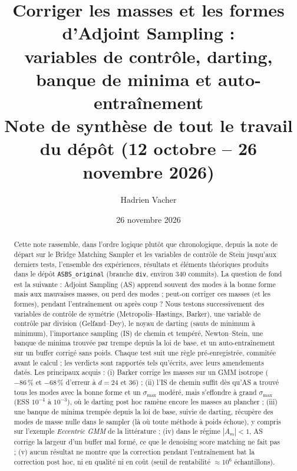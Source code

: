 \documentclass[11pt,a4paper]{article}
\title{Corriger les masses et les formes d'Adjoint Sampling :\\
variables de contrôle, darting, banque de minima et auto-entraînement\\[4pt]
\large Note de synthèse de tout le travail du dépôt (12 octobre -- 26 novembre 2026)}
\author{Hadrien Vacher}
\date{26 novembre 2026}
\newcommand{\smax}{\sigma_{\max}}
\newcommand{\Am}{A_{m}}
\DeclareRobustCommand{\code}[1]{\nolinkurl{#1}}%
\theoremstyle{remark}
\begin{document}
\maketitle

\begin{abstract}
Cette note rassemble, dans l'ordre logique plutôt que chronologique, depuis la note de départ sur le Bridge Matching Sampler et les variables de contrôle de Stein jusqu'aux derniers tests, l'ensemble des expériences, résultats et éléments théoriques produits dans le dépôt \code{ASBS_original} (branche \code{div}, environ 340 commits). La question de fond est la suivante : Adjoint Sampling (AS) apprend souvent des modes à la bonne forme mais aux mauvaises masses, ou perd des modes ; peut-on corriger ces masses (et les formes), pendant l'entraînement ou après coup ? Nous testons successivement des variables de contrôle de symétrie (Metropolis--Hastings, Barker), une variable de contrôle par division (Gelfand--Dey), le noyau de darting (sauts de minimum à minimum), l'importance sampling (IS) de chemin et tempéré, Newton--Stein, une banque de minima trouvée par trempe depuis la loi de base, et un auto-entraînement sur un buffer corrigé sans poids. Chaque test suit une règle pré-enregistrée, commitée avant le calcul ; les verdicts sont rapportés tels qu'écrits, avec leurs amendements datés. Les principaux acquis : (i) Barker corrige les masses sur un GMM isotrope ($-86\,\%$ et $-68\,\%$ d'erreur à $d=24$ et $36$) ; (ii) l'IS de chemin suffit dès qu'AS a trouvé tous les modes avec la bonne forme et un $\smax$ modéré, mais s'effondre à grand $\smax$ (ESS $10^{-4}$ à $10^{-3}$), où le darting post hoc ramène encore les masses au plancher ; (iii) une banque de minima trempée depuis la loi de base, suivie de darting, récupère des modes de masse nulle dans le sampler (là où toute méthode à poids échoue), y compris sur l'exemple \emph{Eccentric GMM} de la littérature ; (iv) dans le régime $|\Am|<1$, AS corrige la largeur d'un buffer mal formé, ce que le denoising score matching ne fait pas ; (v) aucun résultat ne montre que la correction pendant l'entraînement bat la correction post hoc, ni en qualité ni en coût (seuil de rentabilité $\approx 10^{6}$ échantillons).
\end{abstract}

\tableofcontents
\newpage















\appendix


\end{document}
